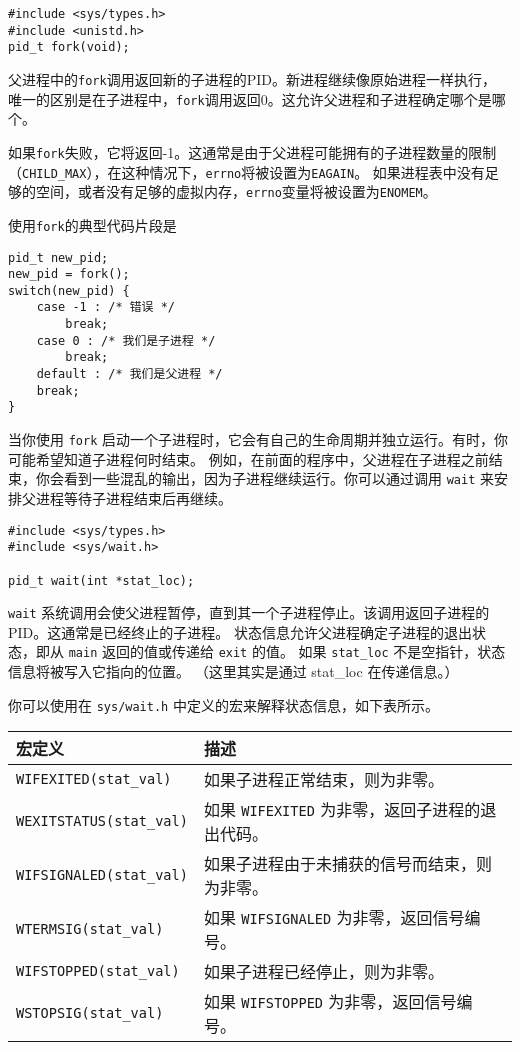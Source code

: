 \documentclass{ctexart}
\begin{document}
\begin{verbatim}  
#include <sys/types.h>  
#include <unistd.h>  
pid_t fork(void);  
\end{verbatim}  
  
父进程中的\texttt{fork}调用返回新的子进程的PID。新进程继续像原始进程一样执行，
唯一的区别是在子进程中，\texttt{fork}调用返回0。这允许父进程和子进程确定哪个是哪个。  
  
如果\texttt{fork}失败，它将返回-1。这通常是由于父进程可能拥有的子进程数量的限制
（\texttt{CHILD\_MAX}），在这种情况下，\texttt{errno}将被设置为\texttt{EAGAIN}。
如果进程表中没有足够的空间，或者没有足够的虚拟内存，\texttt{errno}变量将被设置为\texttt{ENOMEM}。  
  
使用\texttt{fork}的典型代码片段是  
  
\begin{verbatim}  
pid_t new_pid;  
new_pid = fork();  
switch(new_pid) {  
    case -1 : /* 错误 */  
        break;  
    case 0 : /* 我们是子进程 */  
        break;  
    default : /* 我们是父进程 */  
    break;  
}  
\end{verbatim}  
  
当你使用 \texttt{fork} 启动一个子进程时，它会有自己的生命周期并独立运行。有时，你可能希望知道子进程何时结束。
例如，在前面的程序中，父进程在子进程之前结束，你会看到一些混乱的输出，因为子进程继续运行。你可以通过调用 \texttt{wait} 
来安排父进程等待子进程结束后再继续。  
  
\begin{verbatim}  
#include <sys/types.h>  
#include <sys/wait.h>  

pid_t wait(int *stat_loc);  
\end{verbatim}  
  
\texttt{wait} 系统调用会使父进程暂停，直到其一个子进程停止。该调用返回子进程的PID。这通常是已经终止的子进程。
状态信息允许父进程确定子进程的退出状态，即从 \texttt{main} 返回的值或传递给 \texttt{exit} 的值。
如果 \texttt{stat\_loc} 不是空指针，状态信息将被写入它指向的位置。 （这里其实是通过 stat\_loc 在传递信息。） 

你可以使用在 \texttt{sys/wait.h} 中定义的宏来解释状态信息，如下表所示。  
  
\begin{tabular}{|l|l|}  
\hline  
宏定义 & 描述 \\  
\hline  
\texttt{WIFEXITED(stat\_val)} & 如果子进程正常结束，则为非零。\\  
\texttt{WEXITSTATUS(stat\_val)} & 如果 \texttt{WIFEXITED} 为非零，返回子进程的退出代码。\\  
\texttt{WIFSIGNALED(stat\_val)} & 如果子进程由于未捕获的信号而结束，则为非零。\\  
\texttt{WTERMSIG(stat\_val)} & 如果 \texttt{WIFSIGNALED} 为非零，返回信号编号。\\  
\texttt{WIFSTOPPED(stat\_val)} & 如果子进程已经停止，则为非零。\\  
\texttt{WSTOPSIG(stat\_val)} & 如果 \texttt{WIFSTOPPED} 为非零，返回信号编号。\\  
\hline  
\end{tabular}  
\end{document}
